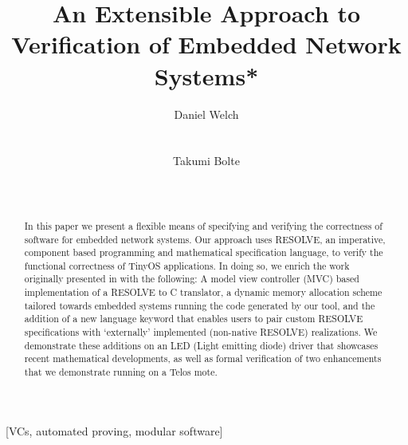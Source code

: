 \documentclass{sig-alternate}
\begin{document}
\title{An Extensible Approach to Verification of Embedded Network Systems*}

\author{
\alignauthor
Daniel Welch\\
\\
\\
\alignauthor
Takumi Bolte\\
\\
\\
}

\maketitle
\begin{abstract}

In this paper we present a flexible means of specifying and verifying the correctness of software for embedded network systems. Our approach uses RESOLVE, an imperative, component based programming and mathematical specification language, to verify the functional correctness of TinyOS applications. In doing so, we enrich the work originally presented in \cite{regula:2010} with the following: A model view controller (MVC) based implementation of a RESOLVE to C translator, a dynamic memory allocation scheme tailored towards embedded systems running the code generated by our tool, and the addition of a new language keyword that enables users to pair custom RESOLVE specifications with `externally' implemented (non-native RESOLVE) realizations. We demonstrate these additions on an LED (Light emitting diode) driver that showcases recent mathematical developments, as well as formal verification of two enhancements that we demonstrate running on a Telos mote.
\end{abstract}

[VCs, automated proving, modular software]
\end{document}
